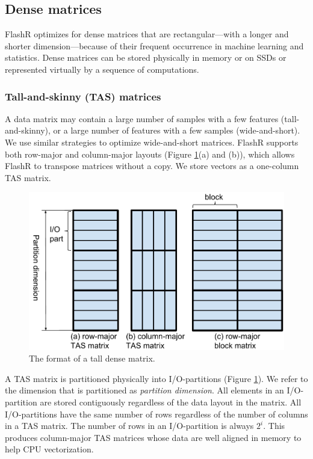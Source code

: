\subsection{Dense matrices}
FlashR optimizes for dense matrices that are rectangular---with
a longer and shorter dimension---because of their frequent occurrence
in machine learning and statistics. Dense matrices can be stored
physically in memory or on SSDs or represented virtually by a sequence of
computations.

\subsubsection{Tall-and-skinny (TAS) matrices}
A data matrix may contain a large number of samples with a few features
(tall-and-skinny),
or a large number of features with a few samples (wide-and-short).
We use similar strategies to optimize wide-and-short matrices. FlashR
supports both row-major and column-major layouts (Figure \ref{fig:den_mat}(a)
and (b)), which allows FlashR to transpose matrices without a copy.
We store vectors as a one-column TAS matrix.

\begin{figure}
	\centering
	\includegraphics[scale=0.4]{FlashMatrix_figs/dense_matrix2.pdf}
	\vspace{-5pt}
	\caption{The format of a tall dense matrix.}
	\label{fig:den_mat}
  \vspace{-12pt}
\end{figure}

A TAS matrix is partitioned physically into I/O-partitions (Figure
\ref{fig:den_mat}). We refer to the dimension that is partitioned as
\textit{partition dimension}. All elements in an I/O-partition are stored
contiguously regardless of the data layout in the matrix. All 
I/O-partitions have the same number of rows regardless of
the number of columns in a TAS matrix. The number of rows in
an I/O-partition is always $2^i$. This produces column-major TAS
matrices whose data are well aligned in memory to help CPU vectorization.


